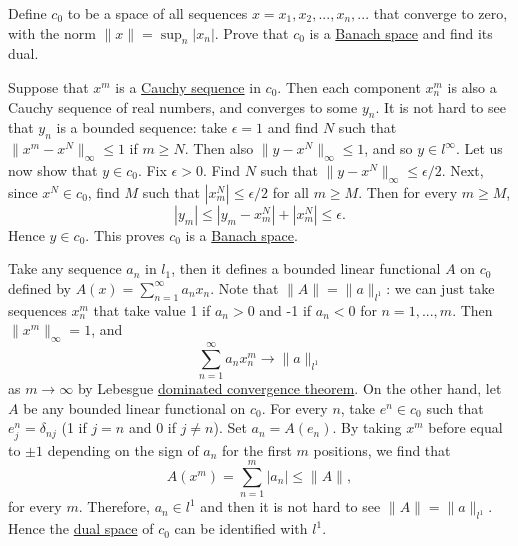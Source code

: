  \begin{exercise}
    Define $c_{0}$ to be a space of all sequences $x=x_{1},x_{2},...,x_{n},...$ that converge to zero, with the norm $\|x\|=\sup_{n}|x_{n}|$. Prove that $c_{0}$ is a \hyperref[mv-def:banach-space]{Banach space} and find its dual.
  \end{exercise}
  \begin{solution}
    Suppose that $x^{m}$ is a \hyperref[real-def:cauchy-sequence]{Cauchy sequence} in $c_{0}$. Then each component $x_{n}^{m}$ is also a Cauchy sequence of real numbers, and converges to some $y_{n}$. It is not hard to see that $y_{n}$ is a bounded sequence: take $\epsilon=1$ and find $N$ such that $\|x^{m}-x^{N}\|_{\infty}\le1$ if $m\ge N$. Then also $\|y-x^{N}\|_{\infty}\le1$, and so $y\in l^{\infty}$. Let us now show that $y\in c_{0}$. Fix $\epsilon>0$. Find $N$ such that $\|y-x^{N}\|_{\infty}\le\epsilon/2$. Next, since $x^{N}\in c_{0}$, find $M$ such that $|x_{m}^{N}|\le\epsilon/2$ for all $m\ge M$. Then for every $m\ge M$,
    \begin{equation}
      |y_{m}|\le|y_{m}-x_{m}^{N}|+|x_{m}^{N}|\le\epsilon.
    \end{equation}
    Hence $y\in c_{0}$. This proves $c_{0}$ is a \hyperref[mv-def:banach-space]{Banach space}.

    Take any sequence $a_{n}$ in $l_{1}$, then it defines a bounded linear functional $A$ on $c_{0}$ defined by $A(x)=\sum_{n=1}^{\infty}a_{n}x_{n}$. Note that $\|A\|=\|a\|_{l^{1}}$: we can just take sequences $x_{n}^{m}$ that take value 1 if $a_{n}>0$ and -1 if $a_{n}<0$ for $n=1,...,m$. Then $\|x^{m}\|_{\infty}=1$, and
    \begin{equation}
      \sum_{n=1}^{\infty}a_{n}x_{n}^{m}\rightarrow\|a\|_{l^{1}}
    \end{equation}
    as $m\rightarrow\infty$ by Lebesgue \hyperref[mt-thm:dominated-convergence-theorem]{dominated convergence theorem}. On the other hand, let $A$ be any bounded linear functional on $c_{0}$. For every $n$, take $e^{n}\in c_{0}$ such that $e_{j}^{n}=\delta_{nj}$ (1 if $j=n$ and 0 if $j\ne n$). Set $a_{n}=A(e_{n})$. By taking $x^{m}$ before equal to $\pm1$ depending on the sign of $a_{n}$ for the first $m$ positions, we find that
    \begin{equation}
      A(x^{m})=\sum_{n=1}^{m}|a_{n}|\le\|A\|,
    \end{equation}
    for every $m$. Therefore, $a_{n}\in l^{1}$ and then it is not hard to see $\|A\|=\|a\|_{l^{1}}$. Hence the \hyperref[lin-def:dual-space]{dual space} of $c_{0}$ can be identified with $l^{1}$.
  \end{solution}

